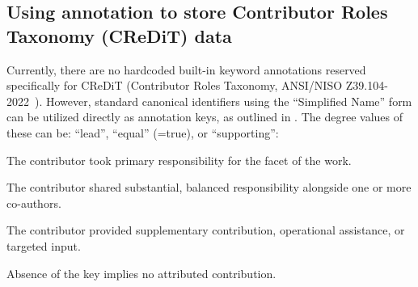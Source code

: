 \documentclass[12pt, twoside]{article}
\begin{document}
\subsection{Using annotation to store Contributor Roles Taxonomy (CReDiT) data}
\label{sec:annotationsForCReDiT}

Currently, there are no hardcoded built-in keyword annotations reserved specifically for \gls{CReDiT} (Contributor Roles Taxonomy, ANSI/NISO Z39.104-2022~\cite{niso_z39_104_2022}). However, standard canonical identifiers using the \enquote{Simplified Name} form can be utilized directly as annotation keys, as outlined in . The degree values of these can be: \enquote{lead}, \enquote{equal} (=true), or \enquote{supporting}:
\begin{description}[labelwidth =\widthof{\textbf{supporting}}, leftmargin = !]
    \item[lead] The contributor took primary responsibility for the facet of the work.

    \item[equal] The contributor shared substantial, balanced responsibility alongside one or more co-authors.

    \item[supporting] The contributor provided supplementary contribution, operational assistance, or targeted input.
\end{description}
Absence of the key implies no attributed contribution.
\end{document}
